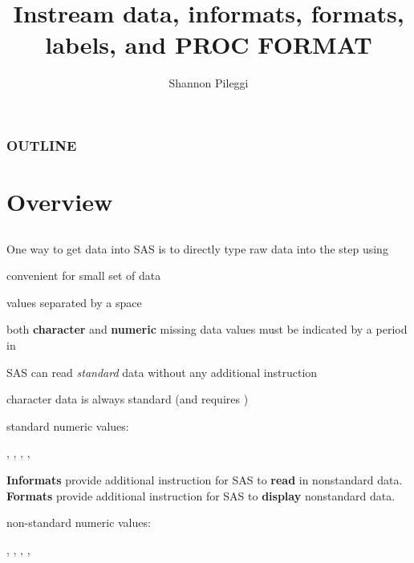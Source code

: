 




\title[Lecture 6]{Instream data, informats, formats, labels, and PROC FORMAT}
\author[Pileggi]{Shannon Pileggi}


\date{}




\begin{frame}
\titlepage
\end{frame}

\begin{frame}
\frametitle{OUTLINE\qquad\qquad\qquad} \tableofcontents[hideallsubsections]
\end{frame}



\section[Overview]{Overview}
\subsection{}
\begin{frame}
One way to get data into SAS is to directly type raw data into the  step using 
\bi
\item convenient for small set of data
\item values separated by a space
\item both \textbf{character} and \textbf{numeric} missing data values must be indicated by a period in 
\ei
\end{frame}

\begin{frame}
SAS can read \emph{standard} data without any additional instruction
\bi
\item character data is always standard (and requires \ttt{\$})
\item standard numeric values:
\item[] , , , , 
\item[]
\ei
\textbf{Informats} provide additional instruction for SAS to \textbf{read} in nonstandard data.  \textbf{Formats} provide additional instruction for SAS to \textbf{display} nonstandard data.
\bi
\item non-standard numeric values:
\item[] , , , , 
\ei
\end{frame}


